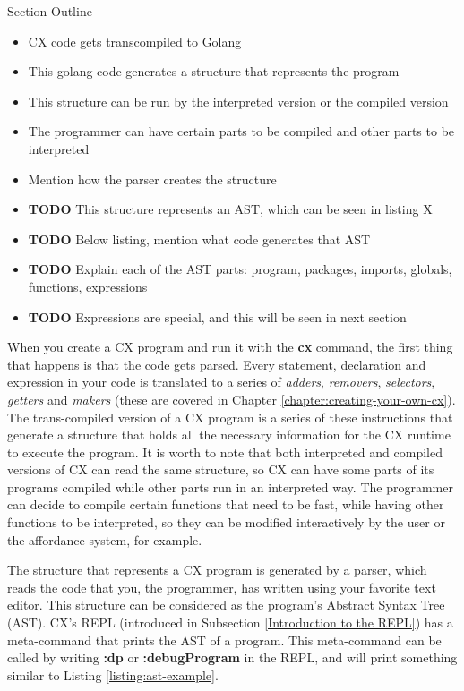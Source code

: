 \documentclass[11pt,fleqn,openany]{book} %
\begin{document}
\begin{remark}
Section Outline
    \begin{itemize}
    	\item CX code gets transcompiled to Golang
        \item This golang code generates a structure that represents the program
        \item This structure can be run by the interpreted version or the compiled version
        \item The programmer can have certain parts to be compiled and other parts to be interpreted
        \item Mention how the parser creates the structure
        \item \textbf{TODO} This structure represents an AST, which can be seen in listing X
        \item \textbf{TODO} Below listing, mention what code generates that AST
        \item \textbf{TODO} Explain each of the AST parts: program, packages, imports, globals, functions, expressions
        \item \textbf{TODO} Expressions are special, and this will be seen in next section
    \end{itemize}
\end{remark}

When you create a CX program and run it with the \textbf{cx} command, the first thing that happens is that the code gets parsed. Every statement, declaration and expression in your code is translated to a series of \textit{adders}, \textit{removers}, \textit{selectors}, \textit{getters} and \textit{makers} (these are covered in Chapter \ref{chapter:creating-your-own-cx}). The trans-compiled version of a CX program is a series of these instructions that generate a structure that holds all the necessary information for the CX runtime to execute the program. It is worth to note that both interpreted and compiled versions of CX can read the same structure, so CX can have some parts of its programs compiled while other parts run in an interpreted way. The programmer can decide to compile certain functions that need to be fast, while having other functions to be interpreted, so they can be modified interactively by the user or the affordance system, for example.

The structure that represents a CX program is generated by a parser, which reads the code that you, the programmer, has written using your favorite text editor. This structure can be considered as the program's Abstract Syntax Tree (AST). CX's REPL (introduced in Subsection \ref{Introduction to the REPL}) has a meta-command that prints the AST of a program. This meta-command can be called by writing \textbf{:dp} or \textbf{:debugProgram} in the REPL, and will print something similar to Listing \ref{listing:ast-example}.
\end{document}
